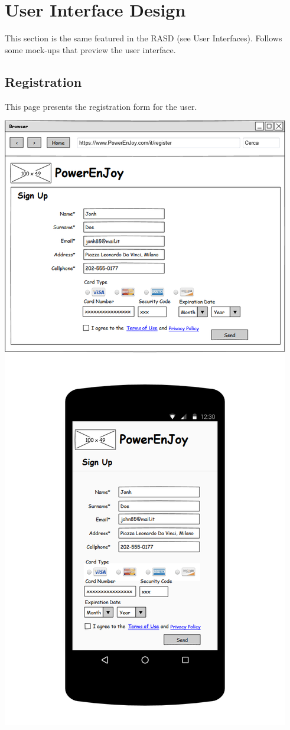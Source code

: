 \section{User Interface Design}
This section is the same featured in the RASD (see User Interfaces). Follows some mock-ups that preview the user interface.

\pagebreak
\subsection{Registration} This page presents the registration form for the user.
\begin{center}
	\includegraphics[width=0.6\linewidth]{"img/ui/registration"}
\end{center}
\pagebreak

